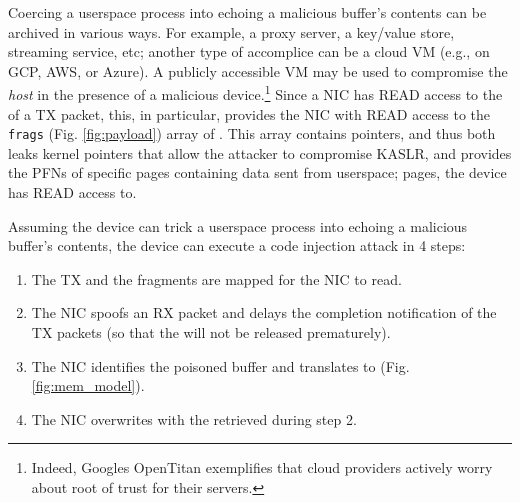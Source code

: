 Coercing a userspace process into echoing a malicious buffer's contents can be archived in various ways. For example, a proxy server, a key/value store, streaming service, etc; another type of accomplice can be a cloud VM (e.g., on GCP, AWS, or Azure). A publicly accessible VM may be used to compromise the \emph{host} in the presence of a malicious device.\footnote{Indeed, Googles OpenTitan \cite{opentitan} exemplifies that cloud providers actively worry about root of trust for their servers.}
Since a NIC has READ access to the \shinfo{} of a TX packet, this, in particular, provides the NIC with READ access to the \texttt{frags} (Fig. \ref{fig:payload}) array of \shinfo{}. This array contains \page{} pointers, and thus both leaks kernel pointers that allow the attacker to compromise KASLR, and provides the PFNs of specific pages containing data sent from userspace; pages, the device has READ access to.


Assuming the device can trick a userspace process into echoing a malicious buffer's contents, the device can execute a code injection attack in 4 steps:

\begin{enumerate}
    \item The TX \data{} and the fragments are mapped for the NIC to read.
    \item The NIC spoofs an RX packet and delays the completion notification of the TX packets (so that the \mabaf{} will not be released prematurely).
    \item The NIC identifies the poisoned buffer and translates \page{} to \kva{} (Fig. \ref{fig:mem_model}).
    \item The NIC overwrites \shinfo{} with the \kva{} retrieved during step 2. 
\end{enumerate}


